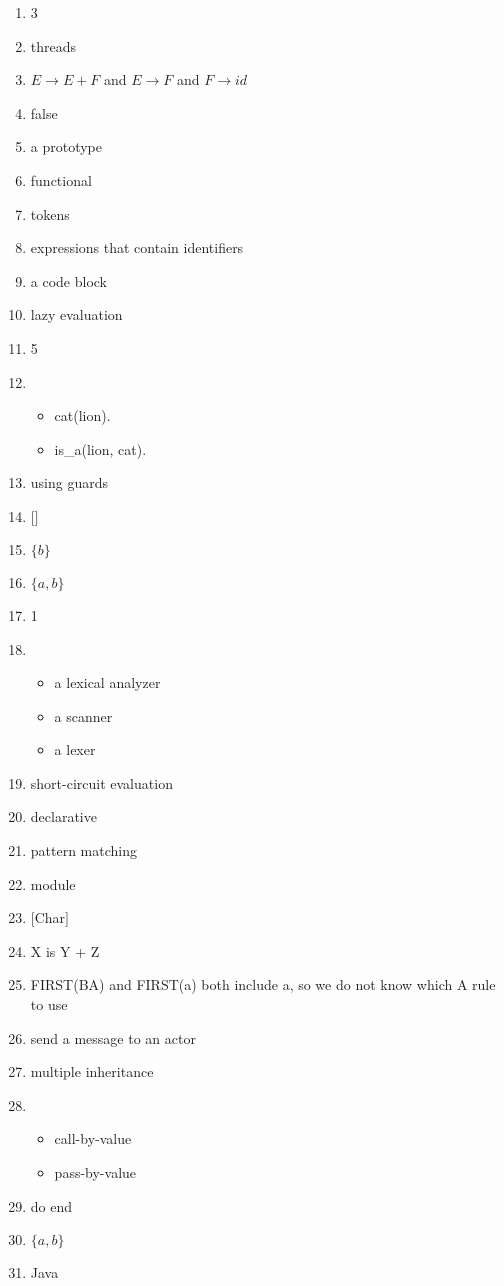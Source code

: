 \documentclass{exam}
\begin{document}
\begin{enumerate}
\item 3
\item threads
\item $E \rightarrow E + F$ and $E \rightarrow F$ and $F \rightarrow id$
\item false
\item a prototype
\item functional
\item tokens
\item expressions that contain identifiers
\item a code block
\item lazy evaluation
\item 5
\item \begin{itemize}
\item cat(lion).
\item is\_a(lion, cat).
\end{itemize}
\item using guards
\item $\lbrack\rbrack$
\item $\{b\}$
\item $\{a,b\}$
\item 1
\item \begin{itemize}
\item a lexical analyzer
\item a scanner
\item a lexer
\end{itemize}
\item short-circuit evaluation
\item declarative
\item pattern matching
\item module
\item $\lbrack$Char$\rbrack$
\item X is Y + Z
\item FIRST(BA) and FIRST(a) both include a, so we do not know which A rule to use
\item send a message to an actor
\item multiple inheritance
\item \begin{itemize}
\item call-by-value
\item pass-by-value
\end{itemize}
\item do end
\item $\{a,b\}$
\item Java

\end{enumerate}
\end{document}

